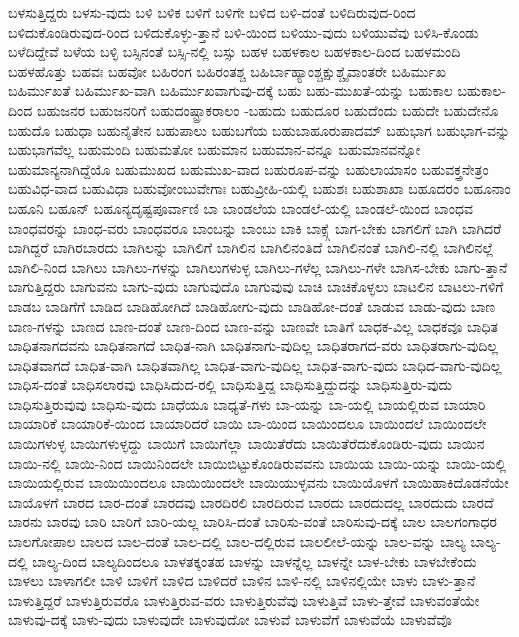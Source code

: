 {ಬಳಸುತ್ತಿದ್ದರು
ಬಳಸು-ವುದು
ಬಳಿ
ಬಳಿಕ
ಬಳಿಗೆ
ಬಳಿಗೇ
ಬಳಿದ
ಬಳಿ-ದಂತೆ
ಬಳಿದಿರುವುದ-ರಿಂದ
ಬಳಿದುಕೊಂಡಿರುವುದ-ರಿಂದ
ಬಳಿದುಕೊಳ್ಳು-ತ್ತಾನೆ
ಬಳಿ-ಯಿಂದ
ಬಳಿಯು-ವುದು
ಬಳಿಯುವೆವು
ಬಳಿಸಿ-ಕೊಂಡು
ಬಳೆದಿದ್ದೇವೆ
ಬಳೆಯ
ಬಳ್ಳಿ
ಬಸ್ಸಿನಂತೆ
ಬಸ್ಸಿ-ನಲ್ಲಿ
ಬಸ್ಸು
ಬಹಳ
ಬಹಳಕಾಲ
ಬಹಳಕಾಲ-ದಿಂದ
ಬಹಳಮಂದಿ
ಬಹಳಹೊತ್ತು
ಬಹವಃ
ಬಹವೋ
ಬಹಿರಂಗ
ಬಹಿರಂತಶ್ಚ
ಬಹಿರ್ಬಾಹ್ಯಾಂಶ್ಚಕ್ಷುಶ್ಚೈವಾಂತರೇ
ಬಹಿರ್ಮುಖ
ಬಹಿರ್ಮುಖತೆ
ಬಹಿರ್ಮುಖ-ವಾಗಿ
ಬಹಿರ್ಮುಖವಾಗುವು-ದಕ್ಕೆ
ಬಹು
ಬಹು-ಮುಖತೆ-ಯನ್ನು
ಬಹುಕಾಲ
ಬಹುಕಾಲ-ದಿಂದ
ಬಹುಜನರ
ಬಹುಜನರಿಗೆ
ಬಹುದಂಷ್ಟ್ರಾಕರಾಲಂ
-ಬಹುದು
ಬಹುದೂರ
ಬಹುದೆಂದು
ಬಹುದೇ
ಬಹುದೇನೊ
ಬಹುದೊ
ಬಹುಧಾ
ಬಹುನೈತೇನ
ಬಹುಪಾಲು
ಬಹುಬಗೆಯ
ಬಹುಬಾಹೂರುಪಾದಮ್
ಬಹುಭಾಗ
ಬಹುಭಾಗ-ವನ್ನು
ಬಹುಭಾಗವೆಲ್ಲ
ಬಹುಮಂದಿ
ಬಹುಮತೋ
ಬಹುಮಾನ
ಬಹುಮಾನ-ವನ್ನೂ
ಬಹುಮಾನವನ್ನೋ
ಬಹುಮಾನ್ಯನಾಗಿದ್ದೆಯೊ
ಬಹುಮುಖದ
ಬಹುಮುಖ-ವಾದ
ಬಹುರೂಪ-ವನ್ನು
ಬಹುಲಾಯಾಸಂ
ಬಹುವಕ್ತ್ರನೇತ್ರಂ
ಬಹುವಿಧ-ವಾದ
ಬಹುವಿಧಾ
ಬಹುವೋಂಬುವೇಗಾಃ
ಬಹುವ್ರೀಹಿ-ಯಲ್ಲಿ
ಬಹುಶಃ
ಬಹುಶಾಖಾ
ಬಹೂದರಂ
ಬಹೂನಾಂ
ಬಹೂನಿ
ಬಹೂನ್
ಬಹೂನ್ಯದೃಷ್ಟಪೂರ್ವಾಣಿ
ಬಾ
ಬಾಂಡಲೆಯ
ಬಾಂಡಲೆ-ಯಲ್ಲಿ
ಬಾಂಡಲೆ-ಯಿಂದ
ಬಾಂಧವ
ಬಾಂಧವರನ್ನು
ಬಾಂಧ-ವರು
ಬಾಂಧವರೂ
ಬಾಂಬನ್ನು
ಬಾಂಬು
ಬಾಕಿ
ಬಾಕ್ಸ್ಗೆ
ಬಾಗ-ಬೇಕು
ಬಾಗಲಿಗೆ
ಬಾಗಿ
ಬಾಗಿದರೆ
ಬಾಗಿದ್ದರೆ
ಬಾಗಿರಬಾರದು
ಬಾಗಿಲನ್ನು
ಬಾಗಿಲಿಗೆ
ಬಾಗಿಲಿನ
ಬಾಗಿಲಿನಂತಿದೆ
ಬಾಗಿಲಿನಂತೆ
ಬಾಗಿಲಿ-ನಲ್ಲಿ
ಬಾಗಿಲಿನಲ್ಲೆ
ಬಾಗಿಲಿ-ನಿಂದ
ಬಾಗಿಲು
ಬಾಗಿಲು-ಗಳನ್ನು
ಬಾಗಿಲುಗಳುಳ್ಳ
ಬಾಗಿಲು-ಗಳೆಲ್ಲ
ಬಾಗಿಲು-ಗಳೇ
ಬಾಗಿಸ-ಬೇಕು
ಬಾಗು-ತ್ತಾನೆ
ಬಾಗುತ್ತಿದ್ದರು
ಬಾಗುವನು
ಬಾಗು-ವುದು
ಬಾಗುವುದೊ
ಬಾಗುವುವು
ಬಾಚಿ
ಬಾಚಿಕೊಳ್ಳಲು
ಬಾಟಲಿನ
ಬಾಟಲು-ಗಳಿಗೆ
ಬಾಡಬ
ಬಾಡಿಗೆಗೆ
ಬಾಡಿದ
ಬಾಡಿಹೋಗಿದೆ
ಬಾಡಿಹೋಗು-ವುದು
ಬಾಡಿಹೋ-ದಂತೆ
ಬಾಡುವ
ಬಾಡು-ವುದು
ಬಾಣ
ಬಾಣ-ಗಳನ್ನು
ಬಾಣದ
ಬಾಣ-ದಂತೆ
ಬಾಣ-ದಿಂದ
ಬಾಣ-ವನ್ನು
ಬಾಣವೇ
ಬಾತಿಗೆ
ಬಾಧಕ-ವಿಲ್ಲ
ಬಾಧಕವೂ
ಬಾಧಿತ
ಬಾಧಿತನಾಗದವನು
ಬಾಧಿತನಾಗದೆ
ಬಾಧಿತ-ನಾಗಿ
ಬಾಧಿತನಾಗು-ವುದಿಲ್ಲ
ಬಾಧಿತರಾಗದ-ವರು
ಬಾಧಿತರಾಗು-ವುದಿಲ್ಲ
ಬಾಧಿತವಾಗದೆ
ಬಾಧಿತ-ವಾಗಿ
ಬಾಧಿತವಾಗಿಲ್ಲ
ಬಾಧಿತ-ವಾಗು-ವುದಿಲ್ಲ
ಬಾಧಿತ-ವಾಗು-ವುದು
ಬಾಧಿದ-ವಾಗು-ವುದಿಲ್ಲ
ಬಾಧಿಸ-ದಂತೆ
ಬಾಧಿಸಲಾರವು
ಬಾಧಿಸಿದುದ-ರಲ್ಲಿ
ಬಾಧಿಸುತ್ತಿದ್ದ
ಬಾಧಿಸುತ್ತಿದ್ದುದನ್ನು
ಬಾಧಿಸುತ್ತಿರು-ವುದು
ಬಾಧಿಸುತ್ತಿರುವುವು
ಬಾಧಿಸು-ವುದು
ಬಾಧೆಯೂ
ಬಾಧ್ಯತೆ-ಗಳು
ಬಾ-ಯನ್ನು
ಬಾ-ಯಲ್ಲಿ
ಬಾಯಲ್ಲಿರುವ
ಬಾಯಾರಿ
ಬಾಯಾರಿಕೆ
ಬಾಯಾರಿಕೆ-ಯಿಂದ
ಬಾಯಾರಿದರೆ
ಬಾಯಿ
ಬಾ-ಯಿಂದ
ಬಾಯಿಂದಲೂ
ಬಾಯಿಂದಲೆ
ಬಾಯಿಂದಲೇ
ಬಾಯಿಗಳುಳ್ಳ
ಬಾಯಿಗಳುಳ್ಳದ್ದು
ಬಾಯಿಗೆ
ಬಾಯಿಗೆಲ್ಲಾ
ಬಾಯಿತೆರೆದು
ಬಾಯಿತೆರೆದುಕೊಂಡಿರು-ವುದು
ಬಾಯಿನ
ಬಾಯಿ-ನಲ್ಲಿ
ಬಾಯಿ-ನಿಂದ
ಬಾಯಿನಿಂದಲೇ
ಬಾಯಿಬಿಟ್ಟುಕೊಂಡಿರುವವನು
ಬಾಯಿಯ
ಬಾಯಿ-ಯನ್ನು
ಬಾಯಿ-ಯಲ್ಲಿ
ಬಾಯಿಯಲ್ಲಿರುವ
ಬಾಯಿಯಿಂದಲೂ
ಬಾಯಿಯಿಂದಲೇ
ಬಾಯಿಯುಳ್ಳವನು
ಬಾಯಿಯೊಳಗೆ
ಬಾಯಿಹಾಕಿದೊಡನೆಯೇ
ಬಾಯೊಳಗೆ
ಬಾರದ
ಬಾರ-ದಂತೆ
ಬಾರದವು
ಬಾರದಿರಲಿ
ಬಾರದಿರುವ
ಬಾರದು
ಬಾರದುದಲ್ಲ
ಬಾರದುದು
ಬಾರದೆ
ಬಾರನು
ಬಾರವು
ಬಾರಿ
ಬಾರಿಗೆ
ಬಾರಿ-ಯಲ್ಲ
ಬಾರಿಸಿ-ದಂತೆ
ಬಾರಿಸು-ವಂತೆ
ಬಾರಿಸುವು-ದಕ್ಕೆ
ಬಾಲ
ಬಾಲಗಂಗಾಧರ
ಬಾಲಗೋಪಾಲ
ಬಾಲದ
ಬಾಲ-ದಂತೆ
ಬಾಲ-ದಲ್ಲಿ
ಬಾಲ-ದಲ್ಲಿರುವ
ಬಾಲಲೀಲೆ-ಯನ್ನು
ಬಾಲ-ವನ್ನು
ಬಾಲ್ಯ
ಬಾಲ್ಯ-ದಲ್ಲಿ
ಬಾಲ್ಯ-ದಿಂದ
ಬಾಲ್ಯದಿಂದಲೂ
ಬಾಳತಕ್ಕಂತಹ
ಬಾಳನ್ನು
ಬಾಳನ್ನೆಲ್ಲ
ಬಾಳನ್ನೇ
ಬಾಳ-ಬೇಕು
ಬಾಳಬೇಕೆಂದು
ಬಾಳಲು
ಬಾಳಾಗಲೀ
ಬಾಳಿ
ಬಾಳಿಗೆ
ಬಾಳಿದ
ಬಾಳಿದರೆ
ಬಾಳಿನ
ಬಾಳಿ-ನಲ್ಲಿ
ಬಾಳಿನಲ್ಲಿಯೇ
ಬಾಳು
ಬಾಳು-ತ್ತಾನೆ
ಬಾಳುತ್ತಿದ್ದರೆ
ಬಾಳುತ್ತಿರುವರೊ
ಬಾಳುತ್ತಿರುವ-ವರು
ಬಾಳುತ್ತಿರುವೆವು
ಬಾಳುತ್ತಿವೆ
ಬಾಳು-ತ್ತೇವೆ
ಬಾಳುವಂತೆಯೇ
ಬಾಳುವು-ದಕ್ಕೆ
ಬಾಳು-ವುದು
ಬಾಳುವುದೇ
ಬಾಳುವುದೋ
ಬಾಳುವೆ
ಬಾಳುವೆಗೆ
ಬಾಳುವೆಯೆ
ಬಾಳುವೆವೊ
}
